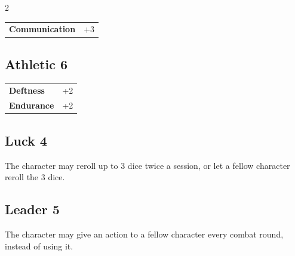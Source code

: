 \begin{multicols}{2}
\begin{tcolorbox}
\begin{tabular}{@{}ll@{}}
    \textbf{Communication} & +3\\
\end{tabular}


\end{tcolorbox}

\begin{tcolorbox}
    \subsection*{Athletic \hfill \small{6 }}
    \tcblower




\begin{tabular}{@{}ll@{}}
    \textbf{Deftness} & +2\\
    \textbf{Endurance} & +2\\
\end{tabular}


\end{tcolorbox}

\begin{tcolorbox}
    \subsection*{Luck \hfill \small{4 }}
    \tcblower
The character may reroll up to 3 dice twice a session, or let a fellow character reroll the 3 dice.


\vspace{3mm}



\end{tcolorbox}

\begin{tcolorbox}
    \subsection*{Leader \hfill \small{5 }}
    \tcblower
The character may give an action to a fellow character every combat round, instead of using it.



\end{tcolorbox}
\end{multicols}
